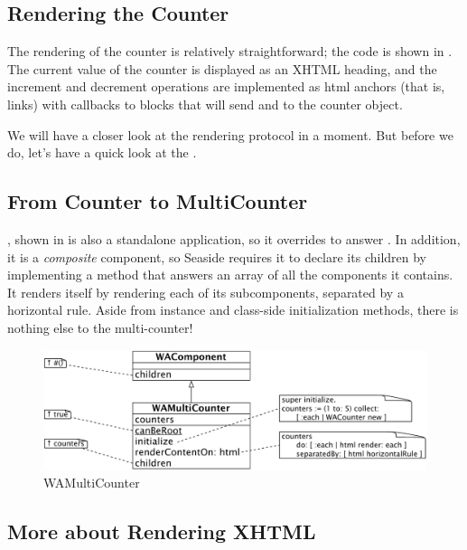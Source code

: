 \documentclass[a4paper,10pt,twoside]{book}
\begin{document}
\subsection{Rendering the Counter}

The rendering of the counter is relatively straightforward; the code is shown in .
The current value of the counter is displayed as an XHTML heading, and the increment and decrement operations are implemented as html anchors (that is, links) with callbacks to blocks that will send  and  to the counter object.

We will have a closer look at the rendering protocol in a moment.
But before we do, let's have a quick look at the .

\subsection{From Counter to MultiCounter}

, shown in  is also a standalone application, so it overrides  to answer .
In addition, it is a \emph{composite} component, so Seaside requires it to declare its children by implementing a method  that answers an array of all the components it contains.
It renders itself by rendering each of its subcomponents, separated by a horizontal rule.
Aside from instance and class-side initialization methods, there is nothing else to the multi-counter!

\begin{figure}[bht]
\begin{center}
\includegraphics[width=\textwidth]{WAMultiCounter}
\caption{WAMultiCounter}
\label{fig:WAMultiCounter}
\end{center}
\end{figure}

\subsection{More about Rendering XHTML}
\end{document}
